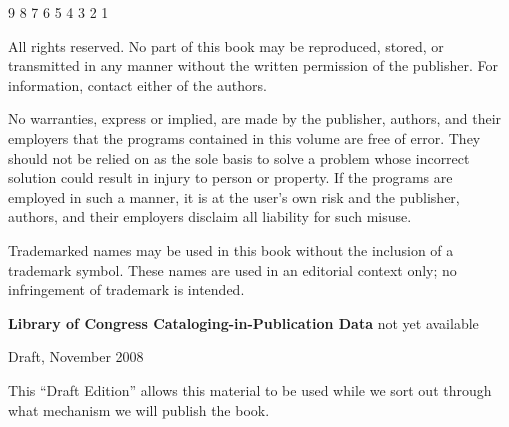  9 8 7 6 5 4 3 2 1

\vspace{0.2in}

\noindent
All rights reserved.  No part of this book may be reproduced, stored, or 
transmitted in any manner without the written permission of the publisher.
For information, contact either of the authors.

\vspace{0.2in}

\noindent
No warranties, express or implied, are made by the publisher, authors, and
their employers that the programs contained in this volume are free of error.
They should not be relied on as the sole basis to solve a problem whose
incorrect solution could result in injury to person or property.
If the programs are employed in such a manner, it is at the user's own 
risk and the publisher, authors, and their employers disclaim all liability 
for such misuse.

\vspace{0.2in}

\noindent
Trademarked names may be used in this book without the inclusion
of a trademark symbol.  These names are used in an editorial context only;
no infringement of trademark is intended.

\vspace{0.2in}

{\bf Library of Congress Cataloging-in-Publication Data} not yet available


% 

Draft, November 2008

This ``Draft Edition'' allows this material to be used 
while we sort out through what mechanism we will publish the book.

